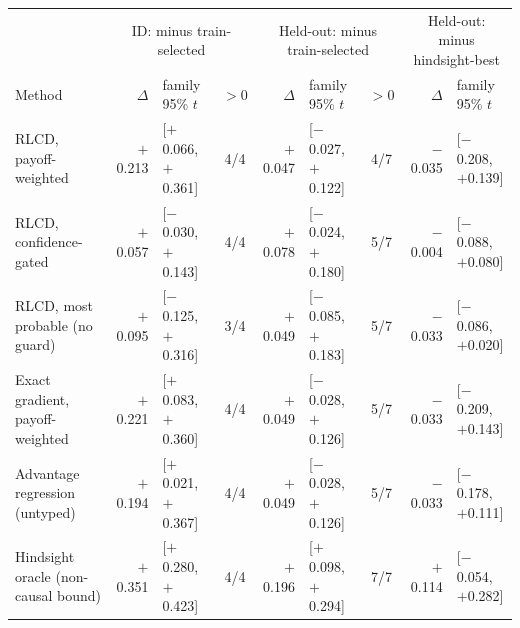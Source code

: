 \begin{tabular}{lrlcrlcrl}
\toprule
 & \multicolumn{3}{c}{ID: minus train-selected} & \multicolumn{3}{c}{Held-out: minus train-selected} & \multicolumn{2}{c}{Held-out: minus hindsight-best} \\
Method & $\Delta$ & family 95\% $t$ & $>0$ & $\Delta$ & family 95\% $t$ & $>0$ & $\Delta$ & family 95\% $t$ \\
\midrule
RLCD, payoff-weighted & $+$0.213 & [$+$0.066, $+$0.361] & 4/4 & $+$0.047 & [$-$0.027, $+$0.122] & 4/7 & $-$0.035 & [$-$0.208, $+$0.139] \\
RLCD, confidence-gated & $+$0.057 & [$-$0.030, $+$0.143] & 4/4 & $+$0.078 & [$-$0.024, $+$0.180] & 5/7 & $-$0.004 & [$-$0.088, $+$0.080] \\
RLCD, most probable (no guard) & $+$0.095 & [$-$0.125, $+$0.316] & 3/4 & $+$0.049 & [$-$0.085, $+$0.183] & 5/7 & $-$0.033 & [$-$0.086, $+$0.020] \\
Exact gradient, payoff-weighted & $+$0.221 & [$+$0.083, $+$0.360] & 4/4 & $+$0.049 & [$-$0.028, $+$0.126] & 5/7 & $-$0.033 & [$-$0.209, $+$0.143] \\
Advantage regression (untyped) & $+$0.194 & [$+$0.021, $+$0.367] & 4/4 & $+$0.049 & [$-$0.028, $+$0.126] & 5/7 & $-$0.033 & [$-$0.178, $+$0.111] \\
Hindsight oracle (non-causal bound) & $+$0.351 & [$+$0.280, $+$0.423] & 4/4 & $+$0.196 & [$+$0.098, $+$0.294] & 7/7 & $+$0.114 & [$-$0.054, $+$0.282] \\
\bottomrule
\end{tabular}
